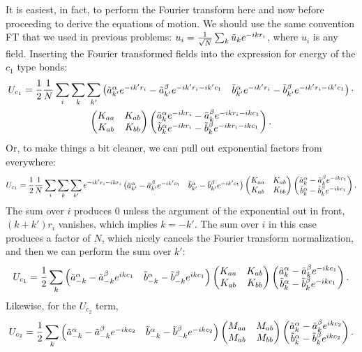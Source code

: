 \documentclass[12pt]{article}
\begin{document}
It is easiest, in fact, to perform the Fourier transform here and now before 
proceeding to derive the equations of motion. We should use the same convention 
FT that we used in previous problems: $u_i=\frac{1}{\sqrt{N}} \sum_k 
\tilde{u}_k e^{-ikr_i}$, where $u_i$ is any field. Inserting the Fourier 
transformed fields into the expression for energy of the $c_1$ type bonds:
\begin{multline*} U_{c_1} = \frac{1}{2} \frac{1}{N} \sum_i \sum_k \sum_{k'}  
\left(\begin{matrix}\tilde a^\alpha_{k'} e^{-ik'r_i} - \tilde a^\beta_{k'} e^{-ik'r_i - ik'c_1} & 
\tilde b^\alpha_{k'} e^{-ik'r_i} - \tilde b^\beta_{k'} e^{-ik'r_i - ik'c_1}\end{matrix}\right) \cdot \\
 \left(\begin{matrix}K_{aa} & K_{ab} \\ K_{ab} & K_{bb}\end{matrix}\right)  \left(\begin{matrix}\tilde a^\alpha_{k} 
e^{-ikr_i} - \tilde a^\beta_{k} e^{-ikr_i - ikc_1} \\
\tilde b^\alpha_{k} e^{-ikr_i} - \tilde b^\beta_{k} e^{-ikr_i - ikc_1}\end{matrix}\right). 
\end{multline*}
Or, to make things a bit cleaner, we can pull out exponential factors from 
everywhere:
\begin{multline*} U_{c_1} = \frac{1}{2} \frac{1}{N} \sum_i \sum_k \sum_{k'}  
e^{-ik'r_i -ikr_i}
\left(\begin{matrix}\tilde a^\alpha_{k'}  - \tilde a^\beta_{k'} e^{- ik'c_1} & 
\tilde b^\alpha_{k'} - \tilde b^\beta_{k'} e^{- ik'c_1}\end{matrix}\right)
 \left(\begin{matrix}K_{aa} & K_{ab} \\ K_{ab} & K_{bb}\end{matrix}\right)  \left(\begin{matrix}\tilde a^\alpha_{k} 
 - \tilde a^\beta_{k} e^{- ikc_1} \\
\tilde b^\alpha_{k} - \tilde b^\beta_{k} e^{- ikc_1}\end{matrix}\right). 
\end{multline*}
The sum over $i$ produces 0 unless the argument of the exponential out in 
front, $(k+k')r_i$ vanishes, which implies $k = -k'$. The sum over $i$ in this 
case produces a factor of $N$, which nicely cancels the Fourier transform 
normalization, and then we can perform the sum over $k'$:
\[ U_{c_1} = \frac{1}{2} \sum_{k} 
\left(\begin{matrix}\tilde a^\alpha_{-k}  - \tilde a^\beta_{-k} e^{ikc_1} & 
\tilde b^\alpha_{-k} - \tilde b^\beta_{-k} e^{ikc_1}\end{matrix}\right)
 \left(\begin{matrix}K_{aa} & K_{ab} \\ K_{ab} & K_{bb}\end{matrix}\right)  \left(\begin{matrix}\tilde a^\alpha_{k} 
 - \tilde a^\beta_{k} e^{- ikc_1} \\
\tilde b^\alpha_{k} - \tilde b^\beta_{k} e^{- ikc_1}\end{matrix}\right).\]
Likewise, for the $U_{c_2}$ term,
\[ U_{c_2} = \frac{1}{2} \sum_{k} 
\left(\begin{matrix}\tilde a^\alpha_{-k}  - \tilde a^\beta_{-k} e^{-ikc_2} & 
\tilde b^\alpha_{-k} - \tilde b^\beta_{-k} e^{-ikc_2}\end{matrix}\right)
 \left(\begin{matrix}M_{aa} & M_{ab} \\ M_{ab} & M_{bb}\end{matrix}\right)  \left(\begin{matrix}\tilde a^\alpha_{k} 
 - \tilde a^\beta_{k} e^{ ikc_2} \\
\tilde b^\alpha_{k} - \tilde b^\beta_{k} e^{ ikc_2}\end{matrix}\right).\]
\end{document}
